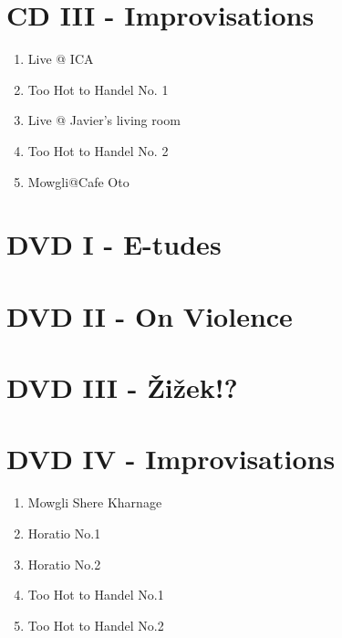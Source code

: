 \section*{CD III - Improvisations}

\begin{enumerate}
\item Live @ ICA
\item Too Hot to Handel No. 1
\item Live @ Javier's living room
\item Too Hot to Handel No. 2
\item Mowgli@Cafe Oto
\end{enumerate}

\section*{DVD I - E-tudes}

\section*{DVD II - On Violence}

\section*{DVD III - \v{Z}i\v{z}ek!?}

\section*{DVD IV - Improvisations}

\begin{enumerate}
\item Mowgli Shere Kharnage
\item Horatio No.1 
\item Horatio No.2 
\item Too Hot to Handel No.1
\item Too Hot to Handel No.2
\end{enumerate}